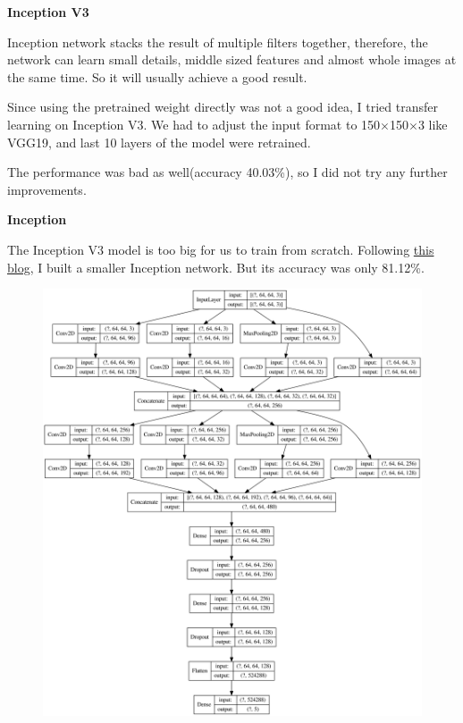 \documentclass[12pt]{article}
\begin{document}
\textbf{Inception V3}

Inception network stacks the result of multiple filters together, therefore, the network can learn small details, middle sized features and almost whole images at the same time. So it will usually achieve a good result.

Since using the pretrained weight directly was not a good idea, I tried transfer learning on Inception V3. We had to adjust the input format to 150$\times$150$\times$3 like VGG19, and last 10 layers of the model were retrained. 

The performance was bad as well(accuracy 40.03\%), so I did not try any further improvements.

\textbf{Inception}

The Inception V3 model is too big for us to train from scratch. Following \href{https://machinelearningmastery.com/how-to-implement-major-architecture-innovations-for-convolutional-neural-networks/}{this blog}, I built a smaller Inception network. But its accuracy was only 81.12\%. 
\begin{figure}[H]
\begin{center}
    \includegraphics[width=1.0\textwidth]{../plots/Inception.png}
\end{center}
\end{figure}
\vspace*{-1.0cm}
\end{document}
